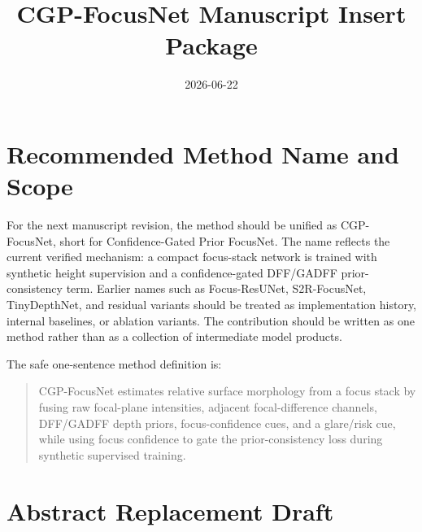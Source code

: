 \documentclass[11pt,a4paper]{article}
\title{CGP-FocusNet Manuscript Insert Package}
\author{}
\date{2026-06-22}
\newcommand{\method}{CGP-FocusNet}
\begin{document}
\maketitle

\section*{Recommended Method Name and Scope}

For the next manuscript revision, the method should be unified as \method, short for Confidence-Gated Prior FocusNet. The name reflects the current verified mechanism: a compact focus-stack network is trained with synthetic height supervision and a confidence-gated DFF/GADFF prior-consistency term. Earlier names such as Focus-ResUNet, S2R-FocusNet, TinyDepthNet, and residual variants should be treated as implementation history, internal baselines, or ablation variants. The contribution should be written as one method rather than as a collection of intermediate model products.

The safe one-sentence method definition is:

\begin{quote}
\method{} estimates relative surface morphology from a focus stack by fusing raw focal-plane intensities, adjacent focal-difference channels, DFF/GADFF depth priors, focus-confidence cues, and a glare/risk cue, while using focus confidence to gate the prior-consistency loss during synthetic supervised training.
\end{quote}

\section*{Abstract Replacement Draft}
\end{document}
